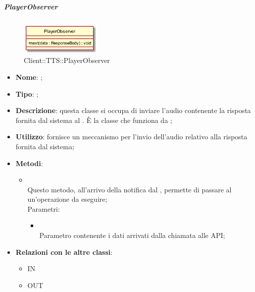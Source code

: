 \hypertarget{PlayerObserver_label}{\subparagraph{PlayerObserver}}
\begin{figure}[h]
	\centering
	\includegraphics[width=0.35\textwidth,height=\textheight,keepaspectratio]{images/ClassPlayerObserver.png}
	\caption{Client::TTS::PlayerObserver}
\end{figure}
\begin{itemize}
	\item \textbf{Nome}: ;
	\item \textbf{Tipo}: ;
	\item \textbf{Descrizione}: questa classe si occupa di inviare l'audio contenente la risposta fornita dal sistema al .
È la classe che funziona da ;
	\item \textbf{Utilizzo}: fornisce un meccanismo per l'invio dell'audio relativo alla risposta fornita dal sistema;
	\item \textbf{Metodi}:
	\begin{itemize}
		\item[]  \\		Questo metodo, all'arrivo della notifica dal , permette di passare al  un'operazione da eseguire;\\
		Parametri:
		\begin{itemize}
			\item {} \\
			Parametro contenente i dati arrivati dalla chiamata alle API;
		\end{itemize}
	\end{itemize}
	\item \textbf{Relazioni con le altre classi}:
	\begin{itemize}
		\item IN \hyperlink{DataArrivedObservable_label}{}
		\item OUT \hyperlink{Player_label}{}
	\end{itemize}
\end{itemize}
\FloatBarrier

